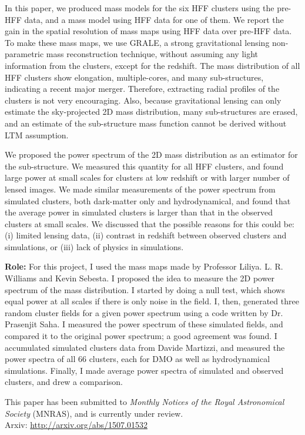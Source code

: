 In this paper, we produced mass models for the six HFF clusters using the pre-HFF
data, and a mass model using HFF data for one of them. We report the gain in the
spatial resolution of mass maps using HFF data over pre-HFF data. To make
these mass maps, we use GRALE, a strong gravitational lensing non-parametric 
mass reconstruction technique, without assuming any light information from
the clusters, except for the redshift. The mass distribution of all HFF
clusters show elongation, multiple-cores, and many sub-structures, 
indicating a recent major merger. Therefore, extracting radial profiles
of the clusters is not very encouraging. Also, because gravitational lensing
can only estimate the sky-projected 2D mass distribution, many sub-structures
are erased, and an estimate of the sub-structure mass function
cannot be derived without LTM assumption. 

We proposed the power spectrum of the 2D mass distribution as an estimator
for the sub-structure. We measured this quantity for all HFF clusters, and 
found large power at small scales for clusters at low redshift or with
larger number of lensed images. We made similar measurements of the
power spectrum from simulated clusters, both dark-matter only and 
hydrodynamical, and
found that the average power in simulated clusters is larger than that
in the observed clusters at small scales. We discussed that the possible reasons
for this could be: (i) limited lensing data, (ii) contrast in redshift between
observed clusters and simulations, or (iii) lack of physics in simulations.


{\bf Role:} For this project, I used the mass maps made by Professor
Liliya. L. R. Williams and Kevin Sebesta. 
I proposed the idea to measure the 2D power spectrum
of the mass distribution. I started
by doing a null test, which shows equal power at all scales if there is
only noise in the field. I, then, generated three random cluster fields 
for a given power spectrum using a code written by Dr. Prasenjit Saha. I 
measured the power spectrum of these simulated fields, and compared it to 
the original power spectrum; a good agreement was found. I accumulated 
simulated clusters data from Davide Martizzi, and measured the power spectra
of all 66 clusters, each for DMO as well as hydrodynamical simulations. Finally, 
I made average power spectra of simulated and observed clusters, and
drew a comparison.









This paper has been submitted to {\it Monthly Notices of the Royal Astronomical
Society} (MNRAS), and is currently under review.
\\
Arxiv: \url{http://arxiv.org/abs/1507.01532}

\clearpage
